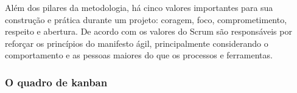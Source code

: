 
Além dos pilares da metodologia, há cinco valores importantes para sua construção e prática durante um projeto: coragem, foco, comprometimento, respeito e abertura.  De acordo com  os valores do Scrum são responsáveis por reforçar os princípios do manifesto ágil, principalmente considerando o comportamento e as pessoas maiores do que os processos e ferramentas. 

\subsubsection{O quadro de kanban}




